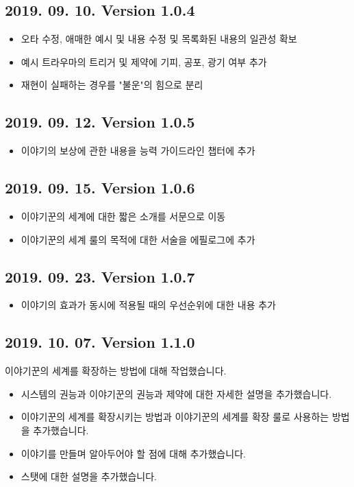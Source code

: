 \documentclass{report}
\begin{document}
	\subsection*{2019. 09. 10. Version 1.0.4}
	\begin{itemize}
		\item 오타 수정, 애매한 예시 및 내용 수정 및 목록화된 내용의 일관성 확보
		\item 예시 트라우마의 트리거 및 제약에 기피, 공포, 광기 여부 추가
		\item 재현이 실패하는 경우를 "불운"의 힘으로 분리
	\end{itemize}
	
	\subsection*{2019. 09. 12. Version 1.0.5}
	\begin{itemize}
		\item 이야기의 보상에 관한 내용을 능력 가이드라인 챕터에 추가
	\end{itemize}
	
	\subsection*{2019. 09. 15. Version 1.0.6}
	\begin{itemize}
		\item 이야기꾼의 세계에 대한 짧은 소개를 서문으로 이동
		\item 이야기꾼의 세계 룰의 목적에 대한 서술을 에필로그에 추가
	\end{itemize}
	
	\subsection*{2019. 09. 23. Version 1.0.7}
	\begin{itemize}
		\item 이야기의 효과가 동시에 적용될 때의 우선순위에 대한 내용 추가
	\end{itemize}


	\subsection*{2019. 10. 07. Version 1.1.0}
	이야기꾼의 세계를 확장하는 방법에 대해 작업했습니다.

	\begin{itemize}
		\item 시스템의 권능과 이야기꾼의 권능과 제약에 대한 자세한 설명을 추가했습니다.
		\item 이야기꾼의 세계를 확장시키는 방법과 이야기꾼의 세계를 확장 룰로 사용하는 방법을 추가했습니다.
		\item 이야기를 만들며 알아두어야 할 점에 대해 추가했습니다.
		\item 스탯에 대한 설명을 추가했습니다.
	\end{itemize}
\end{document}
